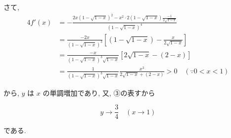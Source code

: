 \documentclass[../main.tex]{subfiles}
\begin{document}
さて,
\[
  \begin{aligned}
    4 f'(x) &= -\frac{2x\left(1-\sqrt{1-x}\right)^2 - x^2 \cdot 2\left(1-\sqrt{1-x}\right) \frac{-1}{2\sqrt{1-x}}}{\left(1-\sqrt{1-x}\right)^4} \\
    &= \frac{-2x}{\left(1-\sqrt{1-x}\right)^3} \left[ \left(1-\sqrt{1-x}\right) - \frac{x}{2\sqrt{1-x}} \right] \\
    &= \frac{-x}{\left(1-\sqrt{1-x}\right)^3 \sqrt{1-x}} \left[ 2\sqrt{1-x} - (2-x) \right] \\
    &= \frac{1}{\left(1-\sqrt{1-x}\right)^3 \sqrt{1-x}} \frac{x^3}{2\sqrt{1-x} + (2-x)} > 0 \quad (\because 0 < x < 1)
  \end{aligned}
\]

から, $y$ は $x$ の単調増加であり, 又, ③の表すから

\[
  y \longrightarrow \frac{3}{4} \quad (x \to 1)
\]

である.
\end{document}
